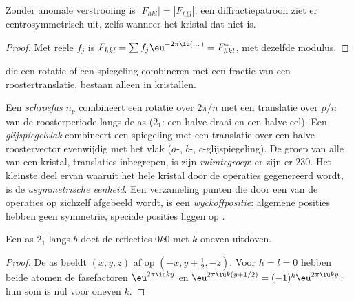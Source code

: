 \begin{proposition}\label{prop:b3:x-ray-diffraction:friedel}
Zonder anomale verstrooiing is $|F_{hkl}| = |F_{\bar h\bar k\bar l}|$: een
diffractiepatroon ziet er centrosymmetrisch uit, zelfs wanneer het kristal
dat niet is.
\end{proposition}

\begin{proof}
Met reële $f_j$ is $F_{\bar h\bar k\bar l} = \sum f_j\eu^{-2\pi\iu(\dots)} = F_{hkl}^*$, met dezelfde
modulus.
\end{proof}

 die een rotatie of een spiegeling combineren met een
fractie van een roostertranslatie, bestaan alleen in kristallen.

\begin{definition}\label{def:b3:x-ray-diffraction:space-group}
Een \emph{schroefas} $n_p$ combineert een rotatie over $2\pi/n$ met een
translatie over $p/n$ van de roosterperiode langs de as ($2_1$: een halve
draai en een halve cel). Een \emph{glijspiegelvlak}
combineert een spiegeling met een translatie over een halve roostervector
evenwijdig met het vlak ($a$-, $b$-, $c$-glijspiegeling).
De groep van alle  van een kristal, translaties
inbegrepen, is zijn \emph{ruimtegroep}: er zijn er 230.
Het kleinste deel ervan waaruit het hele kristal door de operaties
gegenereerd wordt, is de
\emph{asymmetrische eenheid}. Een verzameling
punten die door een  van de operaties op zichzelf afgebeeld
wordt, is een
\emph{wyckoffpositie}: algemene posities hebben geen
symmetrie, speciale posities liggen op .
\end{definition}

\begin{proposition}\label{prop:b3:x-ray-diffraction:screw-absence}
Een as $2_1$ langs $b$ doet de reflecties $0k0$ met $k$ oneven uitdoven.
\end{proposition}

\begin{proof}
De as beeldt $(x, y, z)$ af op $(-x, y + \frac12, -z)$. Voor $h = l = 0$
hebben beide atomen de fasefactoren $\eu^{2\pi\iu ky}$ en $\eu^{2\pi\iu k(y + 1/2)} = (-1)^k\eu^{2\pi\iu ky}$: hun som
is nul voor oneven $k$.
\end{proof}


